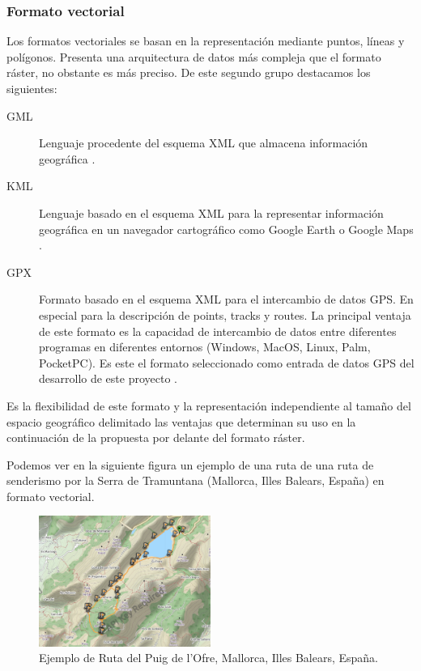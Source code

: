 \subsubsection{Formato vectorial}
Los formatos vectoriales se basan en la representación mediante puntos, líneas y polígonos. Presenta una
arquitectura de datos más compleja que el formato ráster, no obstante es más preciso.
De este segundo grupo destacamos los siguientes:
\begin{description}
\item [\ac{GML}] Lenguaje procedente del esquema \ac{XML} que almacena información geográfica 
\cite{OGC01}.
\item[\ac{KML}] Lenguaje basado en el esquema \ac{XML} para la representar información 
geográfica en un navegador cartográfico como Google Earth o Google Maps \cite{OGC02}.%
\item[\ac{GPX}]Formato basado en el esquema \ac{XML} para el intercambio de datos \ac{GPS}. 
En especial para la descripción de points, tracks y routes. La principal ventaja  de este formato 
es la capacidad de intercambio de datos entre diferentes  programas en diferentes entornos 
(Windows, MacOS, Linux, Palm, PocketPC). Es este el formato seleccionado como entrada de datos 
\ac{GPS} del desarrollo de este proyecto \cite{Topografix01}.
\end{description}
Es la flexibilidad de este formato y la representación independiente al tamaño del espacio geográfico 
delimitado las ventajas que determinan su uso en la continuación de la propuesta por delante del formato 
ráster.

Podemos ver en la siguiente figura un ejemplo de  una ruta de una ruta de senderismo por la Serra de 
Tramuntana (Mallorca, Illes Balears, España) en formato vectorial.
\begin{figure}[!htb]
\begin{center}
\includegraphics[width=0.5\textwidth]{./Imagenes/RutaOfre.png}
\caption{Ejemplo de Ruta del Puig de l'Ofre, Mallorca, Illes Balears, España.}
\label{figure:PointGeneration02}
\end{center}
\end{figure}
\newpage

